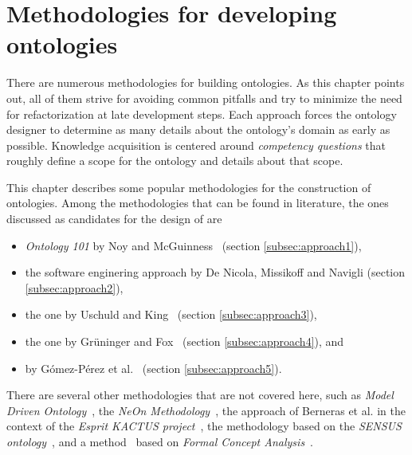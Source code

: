 \chapter{Methodologies for developing ontologies}
\label{ch:development_approaches}

There are numerous methodologies for building ontologies. As this chapter points out, all of them strive for avoiding common pitfalls and try to minimize the need for refactorization at late development steps. Each approach forces the ontology designer to determine as many details about the ontology's domain as early as possible. Knowledge acquisition is centered around \emph{competency questions} that roughly define a scope for the ontology and details about that scope. 

This chapter describes some popular methodologies for the construction of ontologies. Among the methodologies that can be found in literature, the ones discussed as candidates for the design of \thinkhomeweather are

\begin{itemize}
  \item \emph{Ontology 101} by Noy and McGuinness~\cite{Ontology101} (section \ref{subsec:approach1}),

  \item the software enginering approach by De Nicola, Missikoff and Navigli \cite{SoftwareEngineeringOntology} (section \ref{subsec:approach2}),
  
  \item the one by Uschuld and King~\cite{UscholdKing} (section \ref{subsec:approach3}),
  
  \item the one by Grüninger and Fox~\cite{GruningerFox} (section \ref{subsec:approach4}), and
  
  \item \methontology by Gómez-Pérez et al.~\cite{Methontology} (section \ref{subsec:approach5}).
\end{itemize}

There are several other methodologies that are not covered here, such as \emph{Model Driven Ontology}~\cite{ModelDrivenOntology}, the \emph{NeOn Methodology}~\cite{NeOnMethodology}, the approach of Berneras et al. in the context of the \emph{Esprit KACTUS project}~\cite{KACTUSMethodology}, the methodology based on the \emph{SENSUS ontology}~\cite{SENSUSMethodology}, and a method~\cite{FCAMethod} based on \emph{Formal Concept Analysis}~\cite{FormalConceptAnalysis}.


